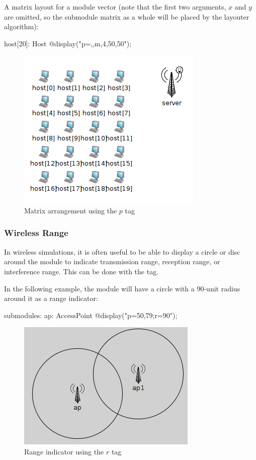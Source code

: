 A matrix layout for a module vector (note that the first two arguments, $x$
and $y$ are omitted, so the submodule matrix as a whole will be placed by
the layouter algorithm):

\begin{ned}
host[20]: Host {
    @display("p=,,m,4,50,50");
}
\end{ned}

\begin{figure}[htbp]
  \begin{center}
    \includegraphics{figures/graphics-ptag}
    \caption{Matrix arrangement using the $p$ tag}
    \label{fig:graphics-ptag}
  \end{center}
\end{figure}

\subsubsection{Wireless Range}

In wireless simulations, it is often useful to be able to display a circle
or disc around the module to indicate transmission range, reception range,
or interference range. This can be done with the  tag.

In the following example, the module will have a circle with a 90-unit radius
around it as a range indicator:

\begin{ned}
submodules:
    ap: AccessPoint {
        @display("p=50,79;r=90");
    }
\end{ned}

\begin{figure}[htbp]
  \begin{center}
    \includegraphics{figures/graphics-rtag}
    \caption{Range indicator using the $r$ tag}
    \label{fig:graphics-rtag}
  \end{center}
\end{figure}

